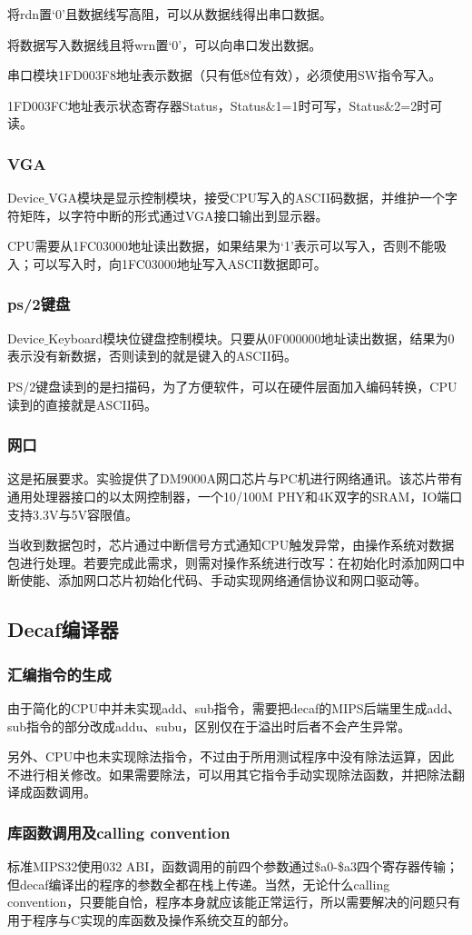 将rdn置‘0’且数据线写高阻，可以从数据线得出串口数据。

将数据写入数据线且将wrn置‘0’，可以向串口发出数据。

串口模块1FD003F8地址表示数据（只有低8位有效），必须使用SW指令写入。

1FD003FC地址表示状态寄存器Status，Status$\&$1=1时可写，Status$\&$2=2时可读。
\subsubsection{VGA}
Device$\_$VGA模块是显示控制模块，接受CPU写入的ASCII码数据，并维护一个字符矩阵，以字符中断的形式通过VGA接口输出到显示器。

CPU需要从1FC03000地址读出数据，如果结果为‘1’表示可以写入，否则不能吸入；可以写入时，向1FC03000地址写入ASCII数据即可。
\subsubsection{ps/2键盘}
Device$\_$Keyboard模块位键盘控制模块。只要从0F000000地址读出数据，结果为0表示没有新数据，否则读到的就是键入的ASCII码。

PS/2键盘读到的是扫描码，为了方便软件，可以在硬件层面加入编码转换，CPU读到的直接就是ASCII码。
\subsubsection{网口}
这是拓展要求。实验提供了DM9000A网口芯片与PC机进行网络通讯。该芯片带有通用处理器接口的以太网控制器，一个10/100M PHY和4K双字的SRAM，IO端口支持3.3V与5V容限值。

当收到数据包时，芯片通过中断信号方式通知CPU触发异常，由操作系统对数据包进行处理。若要完成此需求，则需对操作系统进行改写：在初始化时添加网口中断使能、添加网口芯片初始化代码、手动实现网络通信协议和网口驱动等。
\subsection{Decaf编译器}
\subsubsection{汇编指令的生成}
由于简化的CPU中并未实现add、sub指令，需要把decaf的MIPS后端里生成add、sub指令的部分改成addu、subu，区别仅在于溢出时后者不会产生异常。

另外、CPU中也未实现除法指令，不过由于所用测试程序中没有除法运算，因此不进行相关修改。如果需要除法，可以用其它指令手动实现除法函数，并把除法翻译成函数调用。
\subsubsection{库函数调用及calling convention}
标准MIPS32使用032 ABI，函数调用的前四个参数通过\$a0-\$a3四个寄存器传输；但decaf编译出的程序的参数全都在栈上传递。当然，无论什么calling convention，只要能自恰，程序本身就应该能正常运行，所以需要解决的问题只有用于程序与C实现的库函数及操作系统交互的部分。

